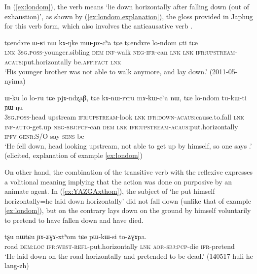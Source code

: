 In (\ref{ex:londom}), the verb   means `lie down horizontally after falling down (out of exhaustion)', as shown by (\ref{ex:londom.explanation}), the gloss provided in Japhug for this verb form, which also involves the anticausative verb .
 
 \begin{exe}
\ex \label{ex:londom}
\gll tɕendɤre ɯ-ʁi nɯ kɤ-ŋke mɯ-ɲɤ-cʰa tɕe tɕendɤre lo-ndom ɕti tɕe \\
\textsc{lnk} \textsc{3sg}.\textsc{poss}-younger.sibling \textsc{dem} \textsc{inf}-walk \textsc{neg}-\textsc{ifr}-can \textsc{lnk} \textsc{lnk} \textsc{ifr}:\textsc{upstream}-\textsc{acaus}:put.horizontally be.\textsc{aff}:\textsc{fact} \textsc{lnk} \\
\glt `His younger brother was not able to walk anymore, and lay down.' (2011-05-nyima)
 \end{exe}
 
\begin{exe}
\ex \label{ex:londom.explanation}
\gll ɯ-ku lo lo-ru tɕe pjɤ-ndʐaβ, tɕe kɤ-nɯ-rɤru mɤ-kɯ-cʰa nɯ, tɕe lo-ndom tu-kɯ-ti ɲɯ-ŋu \\
\textsc{3sg}.\textsc{poss}-head upstream \textsc{ifr}:\textsc{upstream}-look \textsc{lnk} \textsc{ifr}:\textsc{down}-\textsc{acaus}:cause.to.fall \textsc{lnk} \textsc{inf}-\textsc{auto}-get.up \textsc{neg}-\textsc{sbj}:\textsc{pcp}-can \textsc{dem} \textsc{lnk}  \textsc{ifr}:\textsc{upstream}-\textsc{acaus}:put.horizontally \textsc{ipfv}-\textsc{genr}:S/O-say \textsc{sens}-be \\
\glt `He fell down, head looking upstream, not able to get up by himself, so one says .' (elicited, explanation of example \ref{ex:londom})
 \end{exe}
 
On other hand, the combination of the transitive verb with the reflexive expresses a volitional meaning implying that the action was done on purposive by an animate agent. In (\ref{ex:YAZGAxthom}), the subject of  `he put himself horizontally=he laid down horizontally' did not fall down (unlike that of example \ref{ex:londom}), but on the contrary lays down on the ground by himself voluntarily to pretend to have fallen down and have died.
 
\begin{exe}
\ex \label{ex:YAZGAxthom}
\gll tʂu nɯtɕu ɲɤ-ʑɣɤ-xtʰom tɕe pɯ-kɯ-si to-ʑɣɤpa. \\
road \textsc{dem}:\textsc{loc} \textsc{ifr}:\textsc{west}-\textsc{refl}-put.horizontally \textsc{lnk} \textsc{aor}-\textsc{sbj}:\textsc{pcp}-die \textsc{ifr}-pretend \\
\glt `He laid down on the road horizontally and pretended to be dead.' (140517 huli he lang-zh)
 \end{exe}
 

